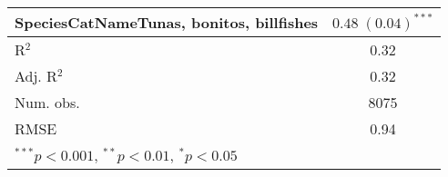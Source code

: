 \documentclass[]{article}
\begin{document}
\begin{table}[h]
\begin{center}
\begin{tabular}{l c }
SpeciesCatNameTunas, bonitos, billfishes    & $0.48 \; (0.04)^{***}$  \\
\hline
R$^2$                                       & 0.32                    \\
Adj. R$^2$                                  & 0.32                    \\
Num. obs.                                   & 8075                    \\
RMSE                                        & 0.94                    \\
\hline
\multicolumn{2}{l}{\scriptsize{$^{***}p<0.001$, $^{**}p<0.01$, $^*p<0.05$}}
\end{tabular}
\label{table:coefficients}
\end{center}
\end{table}
\end{document}
